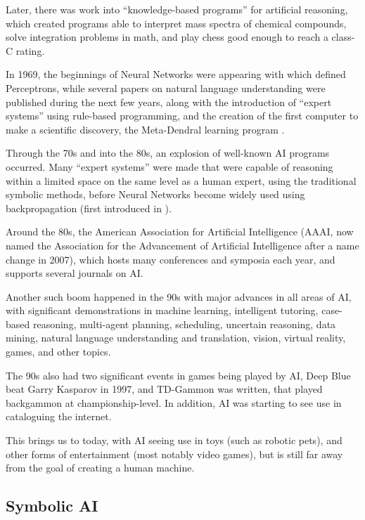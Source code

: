\documentclass[]{report}
\begin{document}
Later, there was work into ``knowledge-based programs'' for artificial
reasoning, which created programs able to interpret mass spectra of chemical
compounds, solve integration problems in math, and play chess good enough to
reach a class-C rating.

In 1969, the beginnings of Neural Networks were appearing with
\citet{minsky1969perceptrons} which defined Perceptrons, while several papers on
natural language understanding were published during the next few years, along
with the introduction of ``expert systems'' using rule-based programming, and
the creation of the first computer to make a scientific discovery, the
Meta-Dendral learning program \citep{buchanan1976applications}.

Through the 70s and into the 80s, an explosion of well-known AI programs
occurred. Many ``expert systems'' were made that were capable of reasoning
within a limited space on the same level as a human expert, using the
traditional symbolic methods, before Neural Networks become widely used using
backpropagation (first introduced in \citet{werbos1974beyond}).

Around the 80s, the American Association for Artificial Intelligence (AAAI, now
named the Association for the Advancement of Artificial Intelligence after a
name change in 2007), which hosts many conferences and symposia each year, and
supports several journals on AI.

Another such boom happened in the 90s with major advances in all areas of AI,
with significant demonstrations in machine learning, intelligent tutoring,
case-based reasoning, multi-agent planning, scheduling, uncertain reasoning,
data mining, natural language understanding and translation, vision, virtual
reality, games, and other topics.

The 90s also had two significant events in games being played by AI, Deep Blue
beat Garry Kasparov in 1997, and TD-Gammon was written, that played backgammon
at championship-level. In addition, AI was starting to see use in cataloguing
the internet.

This brings us to today, with AI seeing use in toys (such as robotic pets), and
other forms of entertainment (most notably video games), but is still far away
from the goal of creating a human machine.

\subsection{Symbolic AI}
\label{sec:symbolic-ai}
\end{document}
